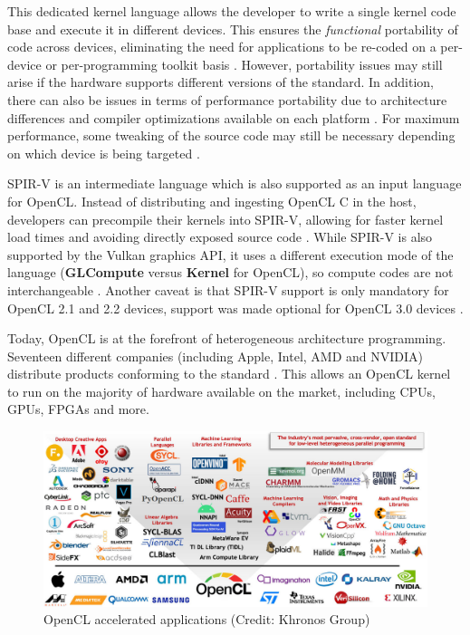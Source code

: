 This dedicated kernel language allows the developer to write a single kernel code base and execute it in different devices. This ensures the \textit{functional} portability of code across devices, eliminating the need for applications to be re-coded on a per-device or per-programming toolkit basis \cite{performance_portability_2013}. However, portability issues may still arise if the hardware supports different versions of the standard. In addition, there can also be issues in terms of performance portability due to architecture differences and compiler optimizations available on each platform \cite{performance_portability_2013, performance_portability_2019, performance_portability_2020}. For maximum performance, some tweaking of the source code may still be necessary depending on which device is being targeted \cite{optimizing_opencl_fpga_integer, optimizing_opencl_fpga_automata}.

SPIR-V is an intermediate language which is also supported as an input language for OpenCL. Instead of distributing and ingesting OpenCL C in the host, developers can precompile their kernels into SPIR-V, allowing for faster kernel load times and avoiding directly exposed source code \cite{spir_overview}. While SPIR-V is also supported by the Vulkan \cite{vulkan} graphics API, it uses a different execution mode of the language (\textbf{GLCompute} versus \textbf{Kernel} for OpenCL), so compute codes are not interchangeable \cite{spir_spec}. Another caveat is that SPIR-V support is only mandatory for OpenCL 2.1 and 2.2 devices, support was made optional for OpenCL 3.0 devices \cite{opencl_spec}.

Today, OpenCL is at the forefront of heterogeneous architecture programming. Seventeen different companies (including Apple, Intel, AMD and NVIDIA) distribute products conforming to the standard \cite{opencl_conformant_companies}. This allows an OpenCL kernel to run on the majority of hardware available on the market, including CPUs, GPUs, FPGAs and more.

\begin{figure}[ht]
    \centering
    \includegraphics[width=\textwidth]{img/opencl-accelerated-apps.png}
    \captionsetup{justification=centering}
    \caption{OpenCL accelerated applications (Credit: Khronos Group)}
\end{figure}

